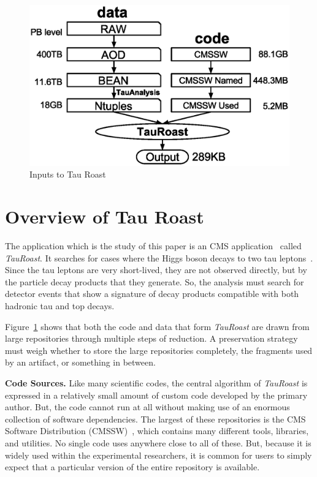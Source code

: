 \begin{figure}[t]
\centering
\includegraphics[width=.5\textwidth]{data-code-size.eps}
\caption{Inputs to Tau Roast}
\label{fig:data-code-size}
\end{figure}

\section{Overview of Tau Roast}

The application which is the study of this paper is an CMS application~\cite{collaboration2008cms} called \emph{TauRoast}.
It searches for cases where the Higgs boson decays to two tau leptons~\cite{chatrchyan2013search}.
Since the tau leptons are very short-lived, they are not observed directly, but by the particle decay products 
that they generate.  So, the analysis must search for detector
events that show a signature of decay products compatible with both hadronic tau and top decays.  

Figure~\ref{fig:data-code-size} shows that both the code and data
that form \emph{TauRoast} are drawn from large repositories through
multiple steps of reduction.  A preservation strategy must weigh
whether to store the large repositories completely, the fragments
used by an artifact, or something in between.

{\bf Code Sources.} Like many scientific codes, the central algorithm
of \emph{TauRoast} is expressed in a relatively small amount of
custom code developed by the primary author.  But, the code cannot
run at all without making use of an enormous collection of software
dependencies.  
The largest of these repositories is the CMS Software Distribution (CMSSW)~\cite{cms2006cms},
which contains many different tools, libraries, and utilities.  No single code uses anywhere close to all of these.  But, because it is widely used within the experimental researchers, it is common for users to simply expect that a particular version of the entire repository is available.
 
